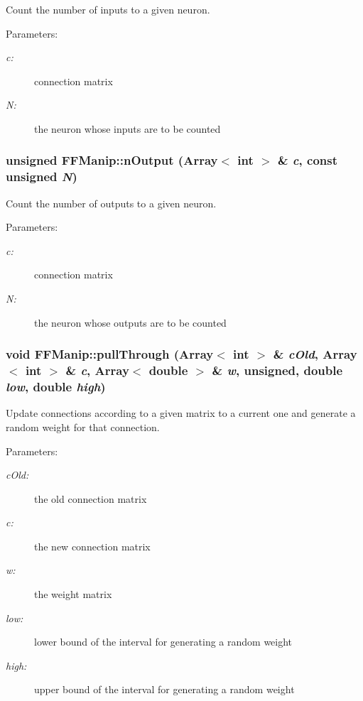 Count the number of inputs to a given neuron.

\begin{Desc}
\item[Parameters: ]\par
\begin{description}
\item[{\em 
c:}]connection matrix \item[{\em 
N:}]the neuron whose inputs are to be counted \end{description}
\end{Desc}
\subsubsection{\setlength{\rightskip}{0pt plus 5cm}unsigned FFManip::n\-Output (Array$<$ int $>$ \& {\em c}, const unsigned {\em N})\hspace{0.3cm}{\tt  [protected]}}\label{classFFManip_b9}


Count the number of outputs to a given neuron.

\begin{Desc}
\item[Parameters: ]\par
\begin{description}
\item[{\em 
c:}]connection matrix \item[{\em 
N:}]the neuron whose outputs are to be counted \end{description}
\end{Desc}
\subsubsection{\setlength{\rightskip}{0pt plus 5cm}void FFManip::pull\-Through (Array$<$ int $>$ \& {\em c\-Old}, Array$<$ int $>$ \& {\em c}, Array$<$ double $>$ \& {\em w}, unsigned, double {\em low}, double {\em high})\hspace{0.3cm}{\tt  [protected]}}\label{classFFManip_b5}


Update connections according to a given matrix to a current one and generate a random weight for that connection.

\begin{Desc}
\item[Parameters: ]\par
\begin{description}
\item[{\em 
c\-Old:}]the old connection matrix \item[{\em 
c:}]the new connection matrix  \item[{\em 
w:}]the weight matrix \item[{\em 
low:}]lower bound of the interval for generating a random weight \item[{\em 
high:}]upper bound of the interval for generating a random weight \end{description}
\end{Desc}
